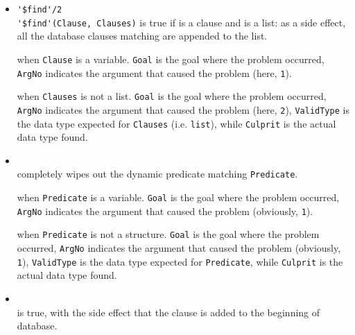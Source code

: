 \begin{itemize}

\item
    \verb|'$find'/2|\\
    \noindent\verb|'$find'(Clause, Clauses)| is true if  is a clause and  is a list: as a side effect, all the database clauses matching  are appended to the  list.


     when \texttt{Clause} is a variable. \texttt{Goal} is the goal where the problem occurred, \texttt{ArgNo} indicates the argument that caused the problem (here, \texttt{1}).

     when \texttt{Clauses} is not a list. \texttt{Goal} is the goal where the problem occurred, \texttt{ArgNo} indicates the argument that caused the problem (here, \texttt{2}), \texttt{ValidType} is the data type expected for \texttt{Clauses} (i.e. \texttt{list}), while \texttt{Culprit} is the actual data type found.

\item
    \\
    \noindent{} completely wipes out the dynamic
    predicate matching \texttt{Predicate}.


     when \texttt{Predicate} is a variable. \texttt{Goal} is the goal where the problem occurred, \texttt{ArgNo} indicates the argument that caused the problem (obviously, \texttt{1}).

     when \texttt{Predicate} is not a structure. \texttt{Goal} is the goal where the problem occurred, \texttt{ArgNo} indicates the argument that caused the problem (obviously, \texttt{1}), \texttt{ValidType} is the data type expected for \texttt{Predicate}, while \texttt{Culprit} is the actual data type found.

\item {}\\
    \noindent{} is true, with the side effect that
    the clause  is added to the beginning of database.


\end{itemize}
